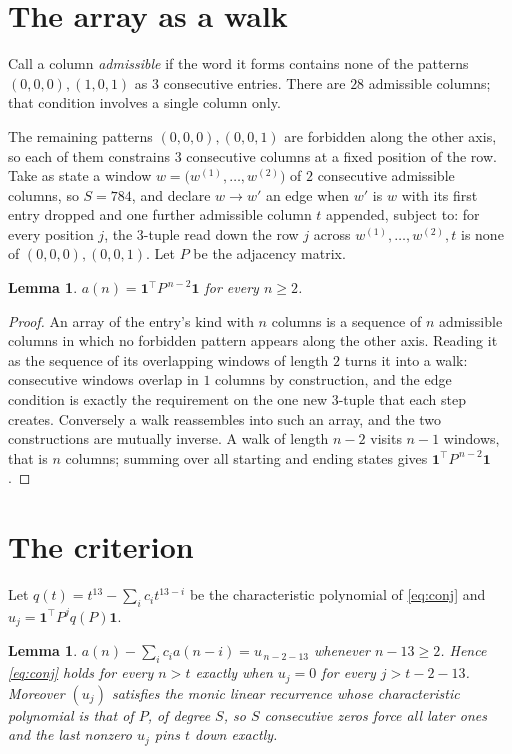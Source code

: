 \documentclass[11pt,a4paper]{article}
\theoremstyle{plain}
\newtheorem{lemma}[theorem]{Lemma}
\theoremstyle{definition}
\begin{document}
\section{The array as a walk}

Call a column \emph{admissible} if the word it forms contains none of the patterns
$(0,0,0), (1,0,1)$ as $3$ consecutive entries. There are $28$ admissible columns; that condition
involves a single column only.

The remaining patterns $(0,0,0), (0,0,1)$ are forbidden along the other axis, so each of them
constrains $3$ consecutive columns at a fixed position of the row. Take as state a
window $w=\bigl(w^{(1)},\dots,w^{(2)}\bigr)$ of $2$ consecutive admissible
columns, so $S=784$, and declare $w\to w'$ an edge when $w'$ is $w$ with its first entry
dropped and one further admissible column $t$ appended, subject to: for every position
$j$, the $3$-tuple read down the row $j$ across $w^{(1)},\dots,w^{(2)},t$
is none of $(0,0,0), (0,0,1)$. Let $P$ be the adjacency matrix.

\begin{lemma}\label{lem:walk}
$a(n)=\mathbf{1}^{\!\top}P^{\,n-2}\mathbf{1}$ for every $n\ge2$.
\end{lemma}

\begin{proof}
An array of the entry's kind with $n$ columns is a sequence of $n$ admissible columns in
which no forbidden pattern appears along the other axis. Reading it as the sequence of its
overlapping windows of length $2$ turns it into a walk: consecutive windows overlap in
$1$ columns by construction, and the edge condition is exactly the requirement on the one
new $3$-tuple that each step creates. Conversely a walk reassembles into such an array,
and the two constructions are mutually inverse. A walk of length $n-2$ visits $n-1$
windows, that is $n$ columns; summing over all starting and ending states gives
$\mathbf{1}^{\!\top}P^{\,n-2}\mathbf{1}$.
\end{proof}

\section{The criterion}

Let $q(t)=t^{13}-\sum_i c_i t^{13-i}$ be the characteristic polynomial of
\eqref{eq:conj} and $u_j=\mathbf{1}^{\!\top}P^{j}q(P)\mathbf{1}$.

\begin{lemma}\label{lem:crit}
$a(n)-\sum_i c_i a(n-i)=u_{\,n-2-13}$ whenever $n-13\ge2$. Hence
\eqref{eq:conj} holds for every $n>t$ exactly when $u_j=0$ for every
$j>t-2-13$. Moreover $(u_j)$ satisfies the monic linear recurrence whose
characteristic polynomial is that of $P$, of degree $S$, so $S$ consecutive zeros force all
later ones and the last nonzero $u_j$ pins $t$ down exactly.
\end{lemma}
\end{document}
